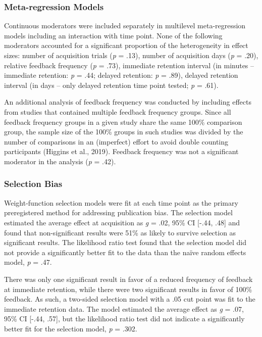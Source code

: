 \documentclass[
  english,
  man, donotrepeattitle,mask,floatsintext]{apa7}
\begin{document}
\hypertarget{meta-regression-models}{%
\subsubsection{Meta-regression Models}\label{meta-regression-models}}

Continuous moderators were included separately in multilevel meta-regression models including an interaction with time point. None of the following moderators accounted for a significant proportion of the heterogeneity in effect sizes: number of acquisition trials (\emph{p} = .13), number of acquisition days (\emph{p} = .20), relative feedback frequency (\emph{p} = .73), immediate retention interval (in minutes -- immediate retention: \emph{p} = .44; delayed retention: \emph{p} = .89), delayed retention interval (in days -- only delayed retention time point tested; \emph{p} = .61).

An additional analysis of feedback frequency was conducted by including effects from studies that contained multiple feedback frequency groups. Since all feedback frequency groups in a given study share the same 100\% comparison group, the sample size of the 100\% groups in such studies was divided by the number of comparisons in an (imperfect) effort to avoid double counting participants (Higgins et al., 2019). Feedback frequency was not a significant moderator in the analysis (\emph{p} = .42).

\hypertarget{selection-bias}{%
\subsubsection{Selection Bias}\label{selection-bias}}

Weight-function selection models were fit at each time point as the primary preregistered method for addressing publication bias. The selection model estimated the average effect at acquisition as \emph{g} = .02, 95\% CI {[}-.44, .48{]} and found that non-significant results were 51\% as likely to survive selection as significant results. The likelihood ratio test found that the selection model did not provide a significantly better fit to the data than the naïve random effects model, \emph{p} = .47.

There was only one significant result in favor of a reduced frequency of feedback at immediate retention, while there were two significant results in favor of 100\% feedback. As such, a two-sided selection model with a .05 cut point was fit to the immediate retention data. The model estimated the average effect as \emph{g} = .07, 95\% CI {[}-.44, .57{]}, but the likelihood ratio test did not indicate a significantly better fit for the selection model, \emph{p} = .302.
\end{document}
